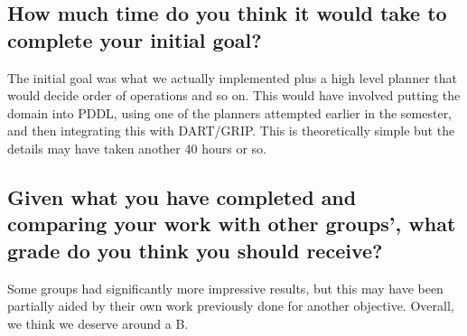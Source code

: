 \documentclass[10pt, conference]{IEEEtran}
\begin{document}
\subsection{How much time do you think it would take to complete your initial goal?}
\label{sec-7-2}

   The initial goal was what we actually implemented plus a high level
   planner that would decide order of operations and so on. This would
   have involved putting the domain into PDDL, using one of the planners
   attempted earlier in the semester, and then integrating this with
   DART/GRIP. This is theoretically simple but the details may have
   taken another 40 hours or so.
\subsection{Given what you have completed and comparing your work with other groups', what grade do you think you should receive?}
\label{sec-7-3}

   Some groups had significantly more impressive results, but this may
   have been partially aided by their own work previously done for
   another objective. Overall, we think we deserve around a B.
\end{document}
